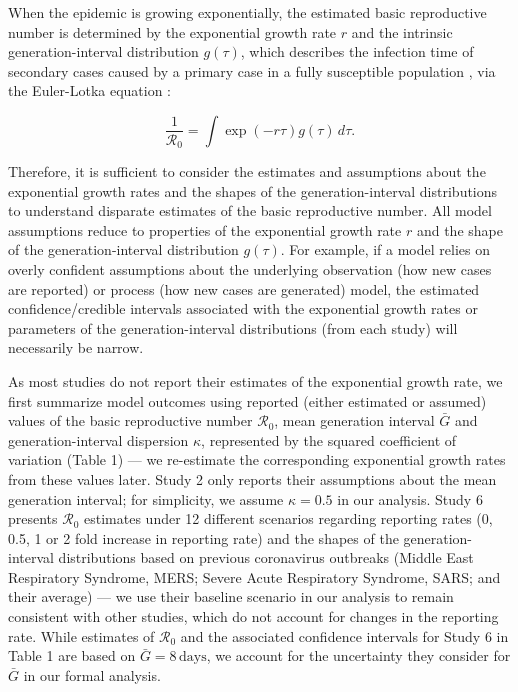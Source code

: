 \documentclass[12pt]{article}
\newcommand{\Ro}{\ensuremath{{\mathcal R}_{0}}\xspace}
\begin{document}
When the epidemic is growing exponentially, the estimated basic reproductive number is determined by the exponential growth rate $r$ and the intrinsic generation-interval distribution $g(\tau)$, which describes the infection time of secondary cases caused by a primary case in a fully susceptible population \citep{champredon2015intrinsic}, via the Euler-Lotka equation \citep{wallinga2007generation}:
\begin{linenomath*}
\begin{equation}
\frac{1}{\Ro} = \int \exp(-r\tau) g(\tau) \, d\tau.
\label{eq:euler}
\end{equation}
\end{linenomath*}
Therefore, it is sufficient to consider the estimates and assumptions about the exponential growth rates and the shapes of the generation-interval distributions to understand disparate estimates of the basic reproductive number.
All model assumptions reduce to properties of the exponential growth rate $r$ and the shape of the generation-interval distribution $g(\tau)$.
For example, if a model relies on overly confident assumptions about the underlying observation (how new cases are reported) or process (how new cases are generated) model, the estimated confidence/credible intervals  associated with the exponential growth rates or parameters of the generation-interval distributions (from each study) will necessarily be narrow.

As most studies do not report their estimates of the exponential growth rate, we first summarize model outcomes using reported (either estimated or assumed) values of the basic reproductive number \Ro, mean generation interval $\bar G$ and generation-interval dispersion $\kappa$, represented by the squared coefficient of variation (Table 1) ---
we re-estimate the corresponding exponential growth rates from these values later.
Study 2 only reports their assumptions about the mean generation interval; for simplicity, we assume $\kappa = 0.5$ in our analysis.
Study 6 presents \Ro estimates under 12 different scenarios regarding reporting rates (0, 0.5, 1 or 2 fold increase in reporting rate) and the shapes of the generation-interval distributions based on previous coronavirus outbreaks (Middle East Respiratory Syndrome, MERS; Severe Acute Respiratory Syndrome, SARS; and their average) ---
we use their baseline scenario in our analysis to remain consistent with other studies, which do not account for changes in the reporting rate.
While estimates of \Ro and the associated confidence intervals for Study 6 in Table 1 are based on $\bar G = 8\,\mathrm{days}$, we account for the uncertainty they consider for $\bar G$ in our formal analysis.
\end{document}
